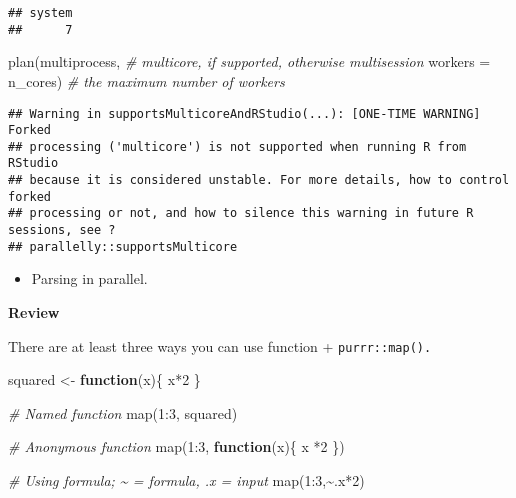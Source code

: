\documentclass[
]{book}
\newenvironment{Shaded}{\begin{snugshade}}{\end{snugshade}}
\newcommand{\AttributeTok}[1]{\textcolor[rgb]{0.77,0.63,0.00}{#1}}
\newcommand{\CommentTok}[1]{\textcolor[rgb]{0.56,0.35,0.01}{\textit{#1}}}
\newcommand{\ControlFlowTok}[1]{\textcolor[rgb]{0.13,0.29,0.53}{\textbf{#1}}}
\newcommand{\DecValTok}[1]{\textcolor[rgb]{0.00,0.00,0.81}{#1}}
\newcommand{\FunctionTok}[1]{\textcolor[rgb]{0.00,0.00,0.00}{#1}}
\newcommand{\NormalTok}[1]{#1}
\newcommand{\OtherTok}[1]{\textcolor[rgb]{0.56,0.35,0.01}{#1}}
\newcommand{\SpecialCharTok}[1]{\textcolor[rgb]{0.00,0.00,0.00}{#1}}
\providecommand{\tightlist}{%
  \setlength{\itemsep}{0pt}\setlength{\parskip}{0pt}}
\begin{document}
\begin{verbatim}
## system 
##      7
\end{verbatim}

\begin{Shaded}
\begin{Highlighting}[]
\FunctionTok{plan}\NormalTok{(multiprocess, }\CommentTok{\# multicore, if supported, otherwise multisession}
     \AttributeTok{workers =}\NormalTok{ n\_cores) }\CommentTok{\# the maximum number of workers}
\end{Highlighting}
\end{Shaded}

\begin{verbatim}
## Warning in supportsMulticoreAndRStudio(...): [ONE-TIME WARNING] Forked
## processing ('multicore') is not supported when running R from RStudio
## because it is considered unstable. For more details, how to control forked
## processing or not, and how to silence this warning in future R sessions, see ?
## parallelly::supportsMulticore
\end{verbatim}

\begin{itemize}
\tightlist
\item
  Parsing in parallel.
\end{itemize}

\textbf{Review}

There are at least three ways you can use function + \texttt{purrr::map().}

\begin{Shaded}
\begin{Highlighting}[]
\NormalTok{squared }\OtherTok{\textless{}{-}} \ControlFlowTok{function}\NormalTok{(x)\{}
\NormalTok{  x}\SpecialCharTok{*}\DecValTok{2} 
\NormalTok{\}}

\CommentTok{\# Named function }
\FunctionTok{map}\NormalTok{(}\DecValTok{1}\SpecialCharTok{:}\DecValTok{3}\NormalTok{, squared)}

\CommentTok{\# Anonymous function }
\FunctionTok{map}\NormalTok{(}\DecValTok{1}\SpecialCharTok{:}\DecValTok{3}\NormalTok{, }\ControlFlowTok{function}\NormalTok{(x)\{ x }\SpecialCharTok{*}\DecValTok{2}\NormalTok{ \})}

\CommentTok{\# Using formula; \textasciitilde{} = formula, .x = input }
\FunctionTok{map}\NormalTok{(}\DecValTok{1}\SpecialCharTok{:}\DecValTok{3}\NormalTok{,}\SpecialCharTok{\textasciitilde{}}\NormalTok{.x}\SpecialCharTok{*}\DecValTok{2}\NormalTok{)}
\end{Highlighting}
\end{Shaded}
\end{document}
